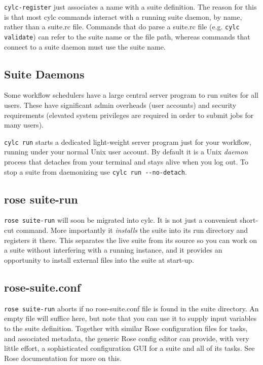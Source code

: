 \lstinline{cylc-register} just associates a name with a suite definition.  The
reason for this is that most cylc commands interact with a running suite
daemon, by name, rather than a suite.rc file.  Commands that do parse a
suite.rc file (e.g.  \lstinline=cylc validate=) can refer to the suite name or
the file path, whereas commands that connect to a suite daemon must use the
suite name.

\subsection{Suite Daemons}

Some workflow schedulers have a large central server program to run suites
for all users.  These have significant admin overheads (user accounts) and
security requirements (elevated system privileges are required in order to
submit jobs for many users).

\lstinline=cylc run= starts a dedicated light-weight server program just for your
workflow, running under your normal Unix user account. By default it is a Unix
{\em daemon} process that detaches from your terminal and stays alive when you
log out. To stop a suite from daemonizing use \lstinline=cylc run --no-detach=. 


\subsection{rose suite-run}

\lstinline{rose suite-run} will soon be migrated into cylc. It is not
just a convenient short-cut command. More importantly it {\em installs} the
suite into its run directory and registers it there.  This separates the
live suite from its source so you can work on a suite without interfering with
a running instance, and it provides an opportunity to install external
files into the suite at start-up.

\subsection{rose-suite.conf}

\lstinline=rose suite-run= aborts if no rose-suite.conf file is found in the
suite directory.  An empty file will suffice here, but note that you can use it
to supply input variables to the suite definition.  Together with similar
Rose configuration files for tasks, and associated metadata, the generic Rose
config editor can provide, with very little effort, a sophisticated
configuration GUI for a suite and all of its tasks.  See Rose documentation for
more on this.

